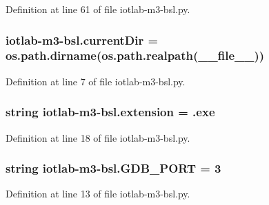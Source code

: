 Definition at line 61 of file iotlab-\/m3-\/bsl.\+py.

\subsubsection[{\texorpdfstring{current\+Dir}{currentDir}}]{\setlength{\rightskip}{0pt plus 5cm}iotlab-\/m3-\/bsl.\+current\+Dir = os.\+path.\+dirname(os.\+path.\+realpath(\+\_\+\+\_\+file\+\_\+\+\_\+))}\hypertarget{namespaceiotlab-m3-bsl_a5703504ac10cd2df6790c60b0b4d64f1}{}\label{namespaceiotlab-m3-bsl_a5703504ac10cd2df6790c60b0b4d64f1}


Definition at line 7 of file iotlab-\/m3-\/bsl.\+py.

\subsubsection[{\texorpdfstring{extension}{extension}}]{\setlength{\rightskip}{0pt plus 5cm}string iotlab-\/m3-\/bsl.\+extension = \textquotesingle{}.exe\textquotesingle{}}\hypertarget{namespaceiotlab-m3-bsl_a2a2b9cc3f6d5c221283fb29b56378b2e}{}\label{namespaceiotlab-m3-bsl_a2a2b9cc3f6d5c221283fb29b56378b2e}


Definition at line 18 of file iotlab-\/m3-\/bsl.\+py.

\subsubsection[{\texorpdfstring{G\+D\+B\+\_\+\+P\+O\+RT}{GDB_PORT}}]{\setlength{\rightskip}{0pt plus 5cm}string iotlab-\/m3-\/bsl.\+G\+D\+B\+\_\+\+P\+O\+RT = \textquotesingle{}3\textquotesingle{}}\hypertarget{namespaceiotlab-m3-bsl_a6fdc776cc8b8835437e9cd155b6df1b1}{}\label{namespaceiotlab-m3-bsl_a6fdc776cc8b8835437e9cd155b6df1b1}


Definition at line 13 of file iotlab-\/m3-\/bsl.\+py.

